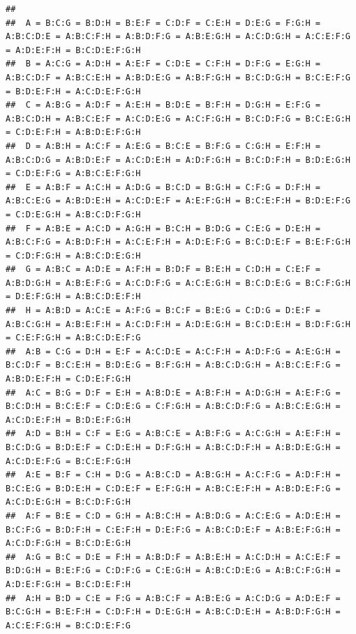 \documentclass[]{article}
\begin{document}
\begin{verbatim}
##                                                                                                                                                               
##  A = B:C:G = B:D:H = B:E:F = C:D:F = C:E:H = D:E:G = F:G:H = A:B:C:D:E = A:B:C:F:H = A:B:D:F:G = A:B:E:G:H = A:C:D:G:H = A:C:E:F:G = A:D:E:F:H = B:C:D:E:F:G:H
##  B = A:C:G = A:D:H = A:E:F = C:D:E = C:F:H = D:F:G = E:G:H = A:B:C:D:F = A:B:C:E:H = A:B:D:E:G = A:B:F:G:H = B:C:D:G:H = B:C:E:F:G = B:D:E:F:H = A:C:D:E:F:G:H
##  C = A:B:G = A:D:F = A:E:H = B:D:E = B:F:H = D:G:H = E:F:G = A:B:C:D:H = A:B:C:E:F = A:C:D:E:G = A:C:F:G:H = B:C:D:F:G = B:C:E:G:H = C:D:E:F:H = A:B:D:E:F:G:H
##  D = A:B:H = A:C:F = A:E:G = B:C:E = B:F:G = C:G:H = E:F:H = A:B:C:D:G = A:B:D:E:F = A:C:D:E:H = A:D:F:G:H = B:C:D:F:H = B:D:E:G:H = C:D:E:F:G = A:B:C:E:F:G:H
##  E = A:B:F = A:C:H = A:D:G = B:C:D = B:G:H = C:F:G = D:F:H = A:B:C:E:G = A:B:D:E:H = A:C:D:E:F = A:E:F:G:H = B:C:E:F:H = B:D:E:F:G = C:D:E:G:H = A:B:C:D:F:G:H
##  F = A:B:E = A:C:D = A:G:H = B:C:H = B:D:G = C:E:G = D:E:H = A:B:C:F:G = A:B:D:F:H = A:C:E:F:H = A:D:E:F:G = B:C:D:E:F = B:E:F:G:H = C:D:F:G:H = A:B:C:D:E:G:H
##  G = A:B:C = A:D:E = A:F:H = B:D:F = B:E:H = C:D:H = C:E:F = A:B:D:G:H = A:B:E:F:G = A:C:D:F:G = A:C:E:G:H = B:C:D:E:G = B:C:F:G:H = D:E:F:G:H = A:B:C:D:E:F:H
##  H = A:B:D = A:C:E = A:F:G = B:C:F = B:E:G = C:D:G = D:E:F = A:B:C:G:H = A:B:E:F:H = A:C:D:F:H = A:D:E:G:H = B:C:D:E:H = B:D:F:G:H = C:E:F:G:H = A:B:C:D:E:F:G
##  A:B = C:G = D:H = E:F = A:C:D:E = A:C:F:H = A:D:F:G = A:E:G:H = B:C:D:F = B:C:E:H = B:D:E:G = B:F:G:H = A:B:C:D:G:H = A:B:C:E:F:G = A:B:D:E:F:H = C:D:E:F:G:H
##  A:C = B:G = D:F = E:H = A:B:D:E = A:B:F:H = A:D:G:H = A:E:F:G = B:C:D:H = B:C:E:F = C:D:E:G = C:F:G:H = A:B:C:D:F:G = A:B:C:E:G:H = A:C:D:E:F:H = B:D:E:F:G:H
##  A:D = B:H = C:F = E:G = A:B:C:E = A:B:F:G = A:C:G:H = A:E:F:H = B:C:D:G = B:D:E:F = C:D:E:H = D:F:G:H = A:B:C:D:F:H = A:B:D:E:G:H = A:C:D:E:F:G = B:C:E:F:G:H
##  A:E = B:F = C:H = D:G = A:B:C:D = A:B:G:H = A:C:F:G = A:D:F:H = B:C:E:G = B:D:E:H = C:D:E:F = E:F:G:H = A:B:C:E:F:H = A:B:D:E:F:G = A:C:D:E:G:H = B:C:D:F:G:H
##  A:F = B:E = C:D = G:H = A:B:C:H = A:B:D:G = A:C:E:G = A:D:E:H = B:C:F:G = B:D:F:H = C:E:F:H = D:E:F:G = A:B:C:D:E:F = A:B:E:F:G:H = A:C:D:F:G:H = B:C:D:E:G:H
##  A:G = B:C = D:E = F:H = A:B:D:F = A:B:E:H = A:C:D:H = A:C:E:F = B:D:G:H = B:E:F:G = C:D:F:G = C:E:G:H = A:B:C:D:E:G = A:B:C:F:G:H = A:D:E:F:G:H = B:C:D:E:F:H
##  A:H = B:D = C:E = F:G = A:B:C:F = A:B:E:G = A:C:D:G = A:D:E:F = B:C:G:H = B:E:F:H = C:D:F:H = D:E:G:H = A:B:C:D:E:H = A:B:D:F:G:H = A:C:E:F:G:H = B:C:D:E:F:G
\end{verbatim}
\end{document}

